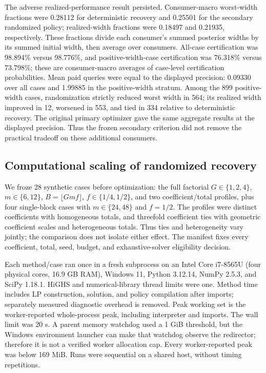 \documentclass[12pt]{article}
\begin{document}
The adverse realized-performance result persisted. Consumer-macro worst-width fractions were 0.28112 for deterministic recovery and 0.25501 for the secondary randomized policy; realized-width fractions were 0.18497 and 0.21935, respectively. These fractions divide each consumer's summed posterior widths by its summed initial width, then average over consumers. All-case certification was 98.894\% versus 98.776\%, and positive-width-case certification was 76.318\% versus 73.798\%; these are consumer-macro averages of case-level certification probabilities. Mean paid queries were equal to the displayed precision: 0.09330 over all cases and 1.99885 in the positive-width stratum. Among the 899 positive-width cases, randomization strictly reduced worst width in 564; its realized width improved in 12, worsened in 553, and tied in 334 relative to deterministic recovery. The original primary optimizer gave the same aggregate results at the displayed precision. Thus the frozen secondary criterion did not remove the practical tradeoff on these additional consumers.

\subsection{Computational scaling of randomized recovery}

We froze 28 synthetic cases before optimization: the full factorial $G\in\{1,2,4\}$, $m\in\{6,12\}$, $B=\lfloor Gmf\rfloor$, $f\in\{1/4,1/2\}$, and two coefficient/total profiles, plus four single-block cases with $m\in\{24,48\}$ and $f=1/2$. The profiles were distinct coefficients with homogeneous totals, and threefold coefficient ties with geometric coefficient scales and heterogeneous totals. Thus ties and heterogeneity vary jointly; the comparison does not isolate either effect. The manifest fixes every coefficient, total, seed, budget, and exhaustive-solver eligibility decision.

Each method/case ran once in a fresh subprocess on an Intel Core i7-8565U (four physical cores, 16.9 GB RAM), Windows 11, Python 3.12.14, NumPy 2.5.3, and SciPy 1.18.1. HiGHS and numerical-library thread limits were one. Method time includes LP construction, solution, and policy compilation after imports; separately measured diagnostic overhead is removed. Peak working set is the worker-reported whole-process peak, including interpreter and imports. The wall limit was 20 s. A parent memory watchdog used a 1 GiB threshold, but the Windows environment launcher can make that watchdog observe the redirector; therefore it is not a verified worker allocation cap. Every worker-reported peak was below 169 MiB. Runs were sequential on a shared host, without timing repetitions.
\end{document}
